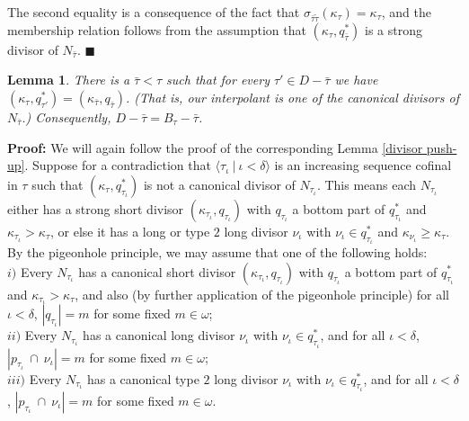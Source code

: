 \documentclass[12pt]{article}
\newtheorem{lem}[thm]{Lemma}
\begin{document}
The second equality is a consequence of the fact that $\sigma_{\bar{\tau} \tilde{\tau}} ( \kappa_\tau ) = \kappa_\tau$, and the membership relation follows from the assumption that $( \kappa_\tau , q_{\bar{\tau}}^* )$ is a strong divisor of $N_{\bar{\tau}}$.  $\blacksquare$\\


\begin{lem} \label{tail-end of interpolants are canonical, short chain}
There is a $\bar{\tau} < \tau$ such that for every $\tau' \in D - \bar{\tau}$ we have $( \kappa_\tau , q_{\tau'}^* ) = ( \kappa_{\bar{\tau}} , q_{\bar{\tau}})$.  (That is, our interpolant is one of the canonical divisors of $N_{\bar{\tau}}$.)  Consequently, $D - \bar{\tau} = B_\tau - \bar{\tau}$.
\end{lem}


\textbf{Proof:} We will again follow the proof of the corresponding Lemma \ref{divisor push-up}.  Suppose for a contradiction that $\langle \tau_\iota \ | \ \iota < \delta \rangle$ is an increasing sequence cofinal in $\tau$ such that $( \kappa_\tau , q_{\tau_\iota}^*)$ is not a canonical divisor of $N_{\tau_\iota}$.  This means each $N_{\tau_\iota}$ either has a strong short divisor $( \kappa_{\tau_\iota} , q_{\tau_\iota})$ with $q_{\tau_\iota}$ a bottom part of $q_{\tau_\iota}^*$ and $\kappa_{\tau_\iota} > \kappa_\tau$, or else it has a long or type $2$ long divisor $\nu_\iota$ with $\nu_\iota \in q_{\tau_\iota}^*$ and $\kappa_{\nu_\iota} \geq \kappa_\tau$.\\

By the pigeonhole principle, we may assume that one of the following holds:\\

$i)$ Every $N_{\tau_\iota}$ has a canonical short divisor $(\kappa_{\tau_\iota} , q_{\tau_\iota} )$ with $q_{\tau_\iota}$ a bottom part of $q_{\tau_\iota}^*$ and $\kappa_{\tau_\iota} > \kappa_\tau$, and also (by further application of the pigeonhole principle) for all $\iota < \delta$, $|q_{\tau_\iota}| = m$ for some fixed $m \in \omega$;\\

$ii)$ Every $N_{\tau_\iota}$ has a canonical long divisor $\nu_\iota$ with $\nu_\iota \in q_{\tau_\iota}^*$, and for all $\iota < \delta$, $|p_{\tau_\iota} \ \cap \ \nu_\iota| = m$ for some fixed $m \in \omega$;\\

$iii)$ Every $N_{\tau_\iota}$ has a canonical type $2$ long divisor $\nu_\iota$ with $\nu_\iota \in q_{\tau_\iota}^*$, and for all $\iota < \delta$, $|p_{\tau_\iota} \ \cap \ \nu_\iota| = m$ for some fixed $m \in \omega$.\\
\end{document}
